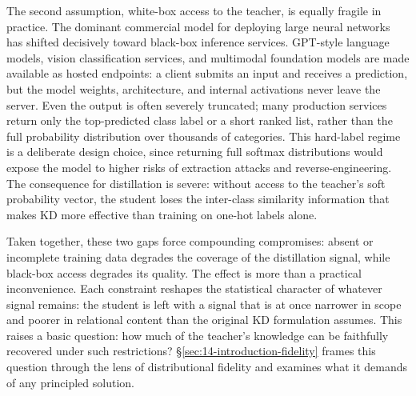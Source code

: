\documentclass[12pt, a4paper, twoside]{book}
\numberwithin{equation}{chapter}
\theoremstyle{plain}
\theoremstyle{definition}
\theoremstyle{remark}
\newenvironment{foldable}{}{}
\begin{document}
\begin{foldable}
  The second assumption, white-box access to the teacher, is equally fragile in practice.
  The dominant commercial model for deploying large neural networks has shifted decisively toward black-box inference services.
  GPT-style language models, vision classification services, and multimodal foundation models are made available as hosted endpoints: a client submits an input and receives a prediction, but the model weights, architecture, and internal activations never leave the server.
  Even the output is often severely truncated; many production services return only the top-predicted class label or a short ranked list, rather than the full probability distribution over thousands of categories.
  This hard-label regime is a deliberate design choice, since returning full softmax distributions would expose the model to higher risks of extraction attacks and reverse-engineering.
  The consequence for distillation is severe: without access to the teacher's soft probability vector, the student loses the inter-class similarity information that makes \ac{KD} more effective than training on one-hot labels alone.
\end{foldable}

\begin{foldable}
  Taken together, these two gaps force compounding compromises: absent or incomplete training data degrades the coverage of the distillation signal, while black-box access degrades its quality.
  The effect is more than a practical inconvenience.
  Each constraint reshapes the statistical character of whatever signal remains: the student is left with a signal that is at once narrower in scope and poorer in relational content than the original \ac{KD} formulation assumes.
  This raises a basic question: how much of the teacher's knowledge can be faithfully recovered under such restrictions?
  \S\ref{sec:14-introduction-fidelity} frames this question through the lens of distributional fidelity and examines what it demands of any principled solution.
\end{foldable}
\end{document}
